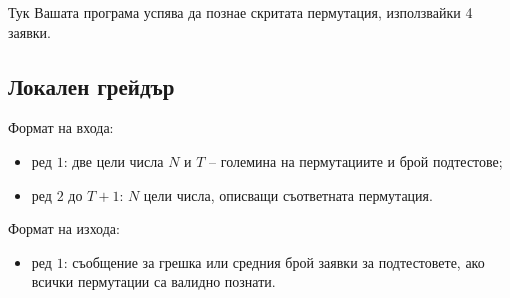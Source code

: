 \documentclass[12pt]{article}
\begin{document}
Тук Вашата програма успява да познае скритата пермутация, използвайки 4 заявки.

\subsection{Локален грейдър}
Формат на входа:
\begin{itemize}
	\item ред $1$: две цели числа $N$ и $T$ -- големина на пермутациите и брой подтестове;
	\item ред $2$ до $T+1$: $N$ цели числа, описващи съответната пермутация.
\end{itemize}

Формат на изхода:
\begin{itemize}
	\item ред $1$: съобщение за грешка или средния брой заявки за подтестовете, ако всички пермутации са валидно познати.
\end{itemize}
\end{document}
